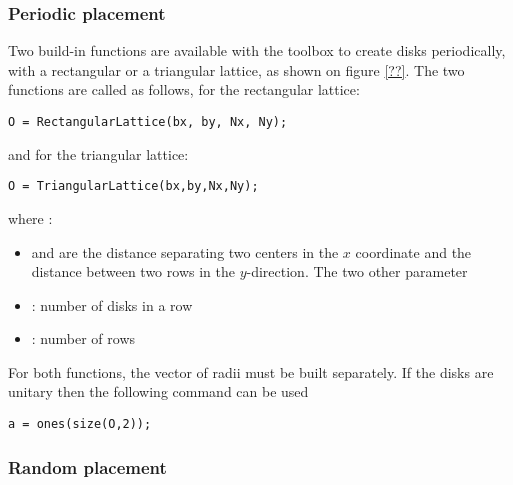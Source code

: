 \subsubsection{Periodic placement}

Two build-in functions are available with the toolbox to create disks periodically, with a rectangular or a triangular lattice, as shown on figure \ref{??}. The two functions are called as follows, for the rectangular lattice:
\begin{verbatim}
O = RectangularLattice(bx, by, Nx, Ny);
\end{verbatim}
and for the triangular lattice:
\begin{verbatim}
O = TriangularLattice(bx,by,Nx,Ny);
\end{verbatim}
where :
\begin{itemize}
\item {} and  are the distance separating two centers in the $x$ coordinate and  the distance between two rows in the $y$-direction. The two other parameter 
\item {}: number of disks in a row
\item {}: number of rows
\end{itemize}
For both functions, the vector of radii must be built separately. If the disks are unitary then the following command can be used
\begin{verbatim}
a = ones(size(O,2));
\end{verbatim}


\subsubsection{Random placement}

